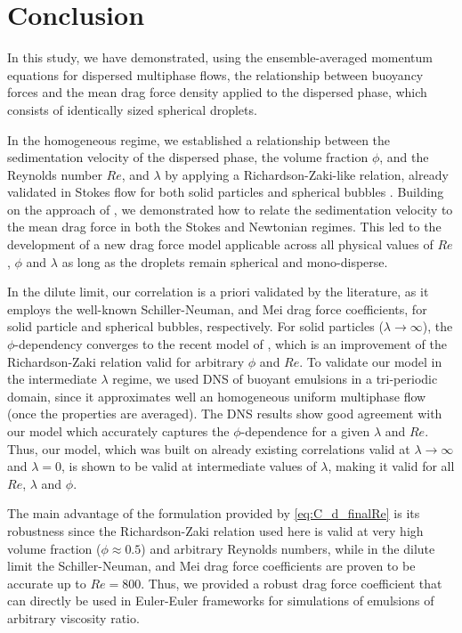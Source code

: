 \section{Conclusion}

In this study, we have demonstrated, using the ensemble-averaged momentum equations for dispersed multiphase flows, the relationship between buoyancy forces and the mean drag force density applied to the dispersed phase, which consists of identically sized spherical droplets. 

In the homogeneous regime, we established a relationship between the sedimentation velocity of the dispersed phase, the volume fraction $\phi$, and the Reynolds number $Re$, and $\lambda$ by applying a Richardson-Zaki-like relation, already validated in Stokes flow for both solid particles and spherical bubbles .
Building on the approach of \citet{jackson2000}, we demonstrated how to relate the sedimentation velocity to the mean drag force in both the Stokes and Newtonian regimes. 
This led to the development of a new drag force model applicable across all physical values of  $Re$, $\phi$ and $\lambda$ as long as the droplets remain spherical and mono-disperse. 

In the dilute limit, our correlation is a priori validated by the literature, as it employs the well-known Schiller-Neuman, and Mei drag force coefficients, for solid particle and spherical bubbles, respectively. 
For solid particles ($\lambda \to \infty$), the $\phi$-dependency converges to the recent model of \citet{kramer2019improvement}, which is an improvement of the Richardson-Zaki relation valid for arbitrary $\phi$ and $Re$.
To validate our model in the intermediate $\lambda$ regime, we used DNS of buoyant emulsions in a tri-periodic domain, since it approximates well an homogeneous uniform multiphase flow (once the properties are averaged).
The DNS results show good agreement with our model which accurately captures the $\phi$-dependence for a given $\lambda$ and $Re$.
Thus, our model, which was built on already existing correlations valid at $\lambda\to\infty$ and $\lambda = 0$, is shown to be valid at intermediate values of $\lambda$, making it valid for all $Re$, $\lambda$ and $\phi$.  

The main advantage of the formulation provided by \ref{eq:C_d_finalRe} is its robustness since the Richardson-Zaki relation used here is valid at very high volume fraction  ($\phi \approx 0.5$) and arbitrary Reynolds numbers, while in the dilute limit the Schiller-Neuman, and Mei drag force coefficients are proven to be accurate up to $Re = 800$. 
Thus, we provided a robust drag force coefficient that can directly be used in Euler-Euler frameworks for simulations of emulsions of arbitrary viscosity ratio. 